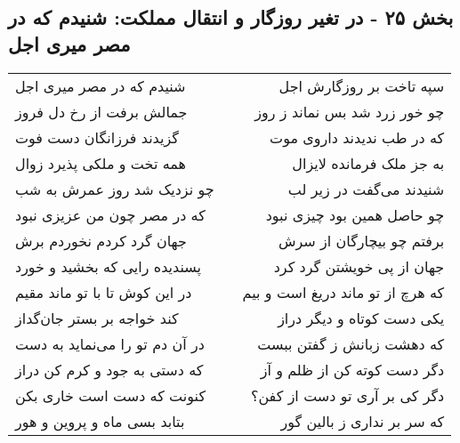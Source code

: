 \begin{center}
\section*{بخش ۲۵ - در تغیر روزگار و انتقال مملکت: شنیدم که در مصر میری اجل}
\label{sec:025}
\begin{longtable}{l p{0.5cm} r}
شنیدم که در مصر میری اجل
&&
سپه تاخت بر روزگارش اجل
\\
جمالش برفت از رخ دل فروز
&&
چو خور زرد شد بس نماند ز روز
\\
گزیدند فرزانگان دست فوت
&&
که در طب ندیدند داروی موت
\\
همه تخت و ملکی پذیرد زوال
&&
به جز ملک فرمانده لایزال
\\
چو نزدیک شد روز عمرش به شب
&&
شنیدند می‌گفت در زیر لب
\\
که در مصر چون من عزیزی نبود
&&
چو حاصل همین بود چیزی نبود
\\
جهان گرد کردم نخوردم برش
&&
برفتم چو بیچارگان از سرش
\\
پسندیده رایی که بخشید و خورد
&&
جهان از پی خویشتن گرد کرد
\\
در این کوش تا با تو ماند مقیم
&&
که هرچ از تو ماند دریغ است و بیم
\\
کند خواجه بر بستر جان‌گداز
&&
یکی دست کوتاه و دیگر دراز
\\
در آن دم تو را می‌نماید به دست
&&
که دهشت زبانش ز گفتن ببست
\\
که دستی به جود و کرم کن دراز
&&
دگر دست کوته کن از ظلم و آز
\\
کنونت که دست است خاری بکن
&&
دگر کی بر آری تو دست از کفن؟
\\
بتابد بسی ماه و پروین و هور
&&
که سر بر نداری ز بالین گور
\\
\end{longtable}
\end{center}

